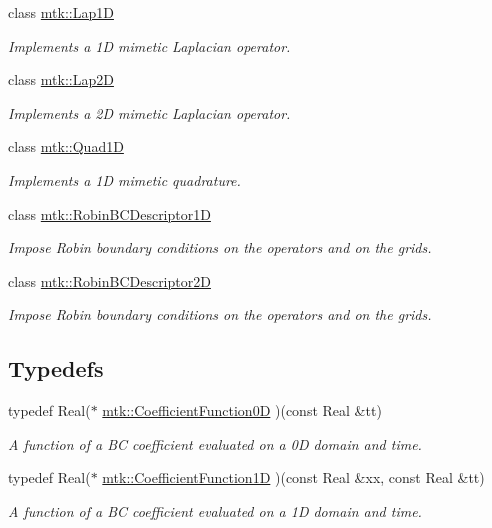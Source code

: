 \begin{DoxyCompactItemize}
class \hyperlink{classmtk_1_1Lap1D}{mtk\+::\+Lap1\+D}
\begin{DoxyCompactList}\small\item\em Implements a 1\+D mimetic Laplacian operator. \end{DoxyCompactList}\item 
class \hyperlink{classmtk_1_1Lap2D}{mtk\+::\+Lap2\+D}
\begin{DoxyCompactList}\small\item\em Implements a 2\+D mimetic Laplacian operator. \end{DoxyCompactList}\item 
class \hyperlink{classmtk_1_1Quad1D}{mtk\+::\+Quad1\+D}
\begin{DoxyCompactList}\small\item\em Implements a 1\+D mimetic quadrature. \end{DoxyCompactList}\item 
class \hyperlink{classmtk_1_1RobinBCDescriptor1D}{mtk\+::\+Robin\+B\+C\+Descriptor1\+D}
\begin{DoxyCompactList}\small\item\em Impose Robin boundary conditions on the operators and on the grids. \end{DoxyCompactList}\item 
class \hyperlink{classmtk_1_1RobinBCDescriptor2D}{mtk\+::\+Robin\+B\+C\+Descriptor2\+D}
\begin{DoxyCompactList}\small\item\em Impose Robin boundary conditions on the operators and on the grids. \end{DoxyCompactList}\end{DoxyCompactItemize}
\subsection*{Typedefs}
\begin{DoxyCompactItemize}
\item 
typedef Real($\ast$ \hyperlink{group__c07-mim__ops_ga04276745b4d511f0f3c636d6e0df7c2d}{mtk\+::\+Coefficient\+Function0\+D} )(const Real \&tt)
\begin{DoxyCompactList}\small\item\em A function of a B\+C coefficient evaluated on a 0\+D domain and time. \end{DoxyCompactList}\item 
typedef Real($\ast$ \hyperlink{group__c07-mim__ops_gaa79593eeb6676d6011db339e01983909}{mtk\+::\+Coefficient\+Function1\+D} )(const Real \&xx, const Real \&tt)
\begin{DoxyCompactList}\small\item\em A function of a B\+C coefficient evaluated on a 1\+D domain and time. \end{DoxyCompactList}\end{DoxyCompactItemize}


